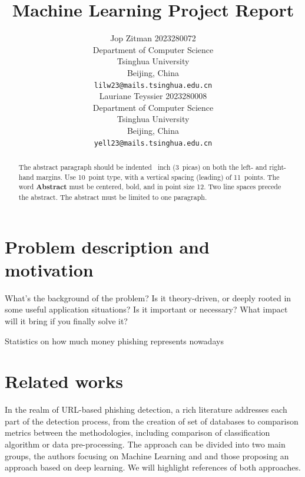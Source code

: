 \documentclass{article}
\title{Machine Learning Project Report}
\author{
    Jop Zitman 2023280072\\
    Department of Computer Science\\
    Tsinghua University\\
    Beijing, China \\
    \texttt{lilw23@mails.tsinghua.edu.cn} \\
    \And
    Lauriane Teyssier 2023280008\\
    Department of Computer Science\\
    Tsinghua University\\
    Beijing, China \\
    \texttt{yell23@mails.tsinghua.edu.cn} \\
}
\begin{document}
    \maketitle

    \begin{abstract}
        The abstract paragraph should be indented ~inch (3~picas) on
        both the left- and right-hand margins.
        Use 10~point type, with a vertical
        spacing (leading) of 11~points.
        The word \textbf{Abstract} must be centered,
        bold, and in point size 12.
        Two line spaces precede the abstract.
        The abstract must be limited to one paragraph.
    \end{abstract}


%


    \section{Problem description and motivation}\label{sec:problem-description-and-motivation}

    What’s the background of the problem?
    Is it theory-driven, or deeply rooted in some useful application situations?
    Is it important or necessary?
    What impact will it bring if you finally solve it?

    Statistics on how much money phishing represents nowadays


    \section{Related works}\label{sec:related-works}

    In the realm of URL-based phishing detection, a rich literature addresses each part of the detection process, from the creation of set of databases to comparison metrics between the methodologies, including comparison of classification algorithm or data pre-processing.
    The approach can be divided into two main groups, the authors focusing on Machine Learning and and those proposing an approach based on deep learning.
    We will highlight references of both approaches.
\end{document}
